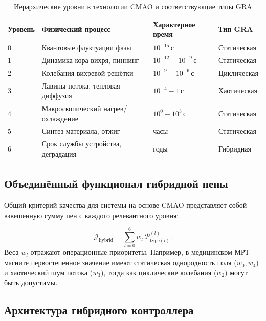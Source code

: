 \documentclass[12pt,a4paper]{article}
\numberwithin{equation}{section}
\begin{document}
\begin{table}[H]
\centering
\caption{Иерархические уровни в технологии CMAO и соответствующие типы GRA}
\label{tab:hierarchy}
\begin{tabular}{@{}llll@{}}
\toprule
Уровень & Физический процесс & Характерное время & Тип GRA \\
\midrule
0 & Квантовые флуктуации фазы & $10^{-15}$\,с & Статическая \\
1 & Динамика кора вихря, пиннинг & $10^{-12} - 10^{-9}$\,с & Статическая \\
2 & Колебания вихревой решётки & $10^{-9} - 10^{-6}$\,с & Циклическая \\
3 & Лавины потока, тепловая диффузия & $10^{-4} - 1$\,с & Хаотическая \\
4 & Макроскопический нагрев/охлаждение & $10^0 - 10^3$\,с & Статическая \\
5 & Синтез материала, отжиг & часы & Статическая \\
6 & Срок службы устройства, деградация & годы & Гибридная \\
\bottomrule
\end{tabular}
\end{table}

\subsection{Объединённый функционал гибридной пены}

Общий критерий качества для системы на основе CMAO представляет собой взвешенную сумму пен с каждого релевантного уровня:

\begin{equation}
\mathcal{J}_{\text{hybrid}} = \sum_{l=0}^{6} w_l \, \mathcal{P}_{\text{type}(l)}^{(l)}.
\label{eq:Jhybrid}
\end{equation}
Веса $w_l$ отражают операционные приоритеты. Например, в медицинском МРТ-магните первостепенное значение имеют статическая однородность поля ($w_0, w_4$) и хаотический шум потока ($w_3$), тогда как циклические колебания ($w_2$) могут быть допустимы.

\subsection{Архитектура гибридного контроллера}
\end{document}
